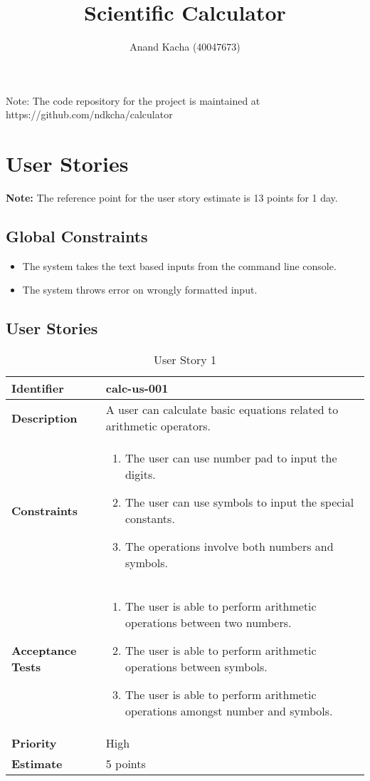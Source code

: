 \documentclass{article}
\title{Scientific Calculator}
\author{Anand Kacha (40047673)}
\begin{document}
\begin{flushleft}
Note: The code repository for the project is maintained at https://github.com/ndkcha/calculator
\end{flushleft}
\tableofcontents
\listoftables

\clearpage

\section{User Stories}
\begin{flushleft}
\textbf{Note:} The reference point for the user story estimate is 13 points for 1 day.
\end{flushleft}

\subsection{Global Constraints}
\begin{itemize}
    \item The system takes the text based inputs from the command line console.
    \item The system throws error on wrongly formatted input.
\end{itemize}

\subsection{User Stories}
\begin{table}[h]
\centering
\begin{tabular}{|p{2.2cm}|p{12cm}|}
\hline
\textbf{Identifier} & {calc-us-001} \\
\hline
\textbf{Description} & {A user can calculate basic equations related to arithmetic operators.}\\
\hline
\textbf{Constraints} & 
\begin{enumerate}
    \item The user can use number pad to input the digits.
    \item The user can use symbols to input the special constants.
    \item The operations involve both numbers and symbols.
\end{enumerate}\\
\hline
\textbf{Acceptance Tests} & 
\begin{enumerate}
    \item The user is able to perform arithmetic operations between two numbers.
    \item The user is able to perform arithmetic operations between symbols.
    \item The user is able to perform arithmetic operations amongst number and symbols.
\end{enumerate}\\
\hline
\textbf{Priority} & {High}\\
\hline
\textbf{Estimate} & {5 points}\\
\hline
\end{tabular}
\caption{User Story 1}
\end{table}
\end{document}
